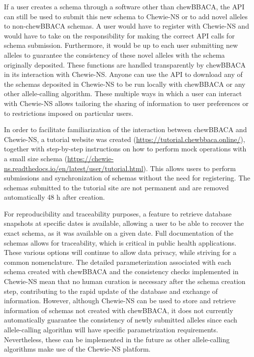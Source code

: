 If a user creates a schema through a software other than chewBBACA, the \ac{API} can still be used to submit this new schema to \ac{Chewie-NS} or to add novel alleles to non-chewBBACA schemas. A user would have to register with \ac{Chewie-NS} and would have to take on the responsibility for making the correct \ac{API} calls for schema submission. Furthermore, it would be up to each user submitting new alleles to guarantee the consistency of these novel alleles with the schema originally deposited. These functions are handled transparently by chewBBACA in its interaction with \ac{Chewie-NS}. Anyone can use the \ac{API} to download any of the schemas deposited in \ac{Chewie-NS} to be run locally with chewBBACA or any other allele-calling algorithm. These multiple ways in which a user can interact with \ac{Chewie-NS} allows tailoring the sharing of information to user preferences or to restrictions imposed on particular users.

In order to facilitate familiarization of the interaction between chewBBACA and \ac{Chewie-NS}, a tutorial website was created (\url{https://tutorial.chewbbaca.online/}), together with step-by-step instructions on how to perform mock operations with a small size schema (\url{https://chewie-ns.readthedocs.io/en/latest/user/tutorial.html}). This allows users to perform submissions and synchronization of schemas without the need for registering. The schemas submitted to the tutorial site are not permanent and are removed automatically 48 h after creation.

For reproducibility and traceability purposes, a feature to retrieve database snapshots at specific dates is available, allowing a user to be able to recover the exact schema, as it was available on a given date. Full documentation of the schemas allows for traceability, which is critical in public health applications. These various options will continue to allow data privacy, while striving for a common nomenclature. The detailed parameterization associated with each schema created with chewBBACA and the consistency checks implemented in \ac{Chewie-NS} mean that no human curation is necessary after the schema creation step, contributing to the rapid update of the database and exchange of information. However, although \ac{Chewie-NS} can be used to store and retrieve information of schemas not created with chewBBACA, it does not currently automatically guarantee the consistency of newly submitted alleles since each allele-calling algorithm will have specific parametrization requirements. Nevertheless, these can be implemented in the future as other allele-calling algorithms make use of the \ac{Chewie-NS} platform.


